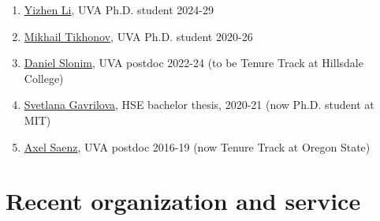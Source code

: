 \documentclass[letterpaper,11pt]{article}
\begin{document}
\begin{enumerate}
    \item \href{https://math.virginia.edu/people/smb2tp/}{Yizhen Li}, UVA Ph.D. student 2024-29
    \item \href{https://mtikhonov.com}{Mikhail Tikhonov}, UVA Ph.D. student 2020-26
    \item \href{https://danielslonim.github.io}{Daniel Slonim}, UVA postdoc 2022-24 (to be Tenure Track at Hillsdale College)
    \item \href{https://math.mit.edu/directory/profile.html?pid=2588}{Svetlana Gavrilova},  HSE bachelor thesis, 2020-21 (now Ph.D. student at MIT)
    \item \href{https://sites.google.com/view/axelsaenz}{Axel Saenz}, UVA postdoc 2016-19 (now Tenure Track at Oregon State)
\end{enumerate}

\section*{Recent organization and service}
\end{document}
